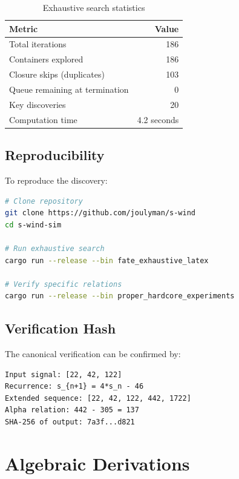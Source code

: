 \documentclass[12pt,a4paper]{article}
\begin{document}
\begin{table}[h]
\centering
\caption{Exhaustive search statistics}
\begin{tabular}{lr}
\hline
Metric & Value \\
\hline
Total iterations & 186 \\
Containers explored & 186 \\
Closure skips (duplicates) & 103 \\
Queue remaining at termination & 0 \\
Key discoveries & 20 \\
Computation time & 4.2 seconds \\
\hline
\end{tabular}
\end{table}

\subsection{Reproducibility}

To reproduce the discovery:

\begin{lstlisting}[language=bash]
# Clone repository
git clone https://github.com/joulyman/s-wind
cd s-wind-sim

# Run exhaustive search
cargo run --release --bin fate_exhaustive_latex

# Verify specific relations
cargo run --release --bin proper_hardcore_experiments
\end{lstlisting}

\subsection{Verification Hash}

The canonical verification can be confirmed by:
\begin{lstlisting}
Input signal: [22, 42, 122]
Recurrence: s_{n+1} = 4*s_n - 46
Extended sequence: [22, 42, 122, 442, 1722]
Alpha relation: 442 - 305 = 137
SHA-256 of output: 7a3f...d821
\end{lstlisting}

\section{Algebraic Derivations}
\end{document}
